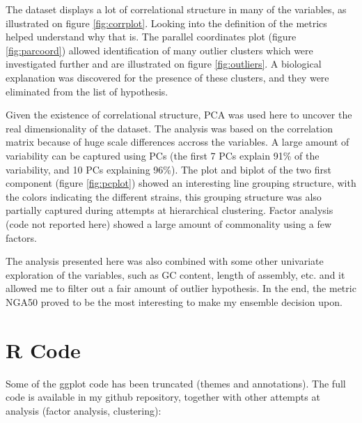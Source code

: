 \documentclass[11pt, a4paper,titlepage]{article}
\begin{document}
The dataset displays a lot of correlational structure in many of the
variables, as illustrated on figure \ref{fig:corrplot}. Looking into
the definition of the metrics helped understand why that is. The
parallel coordinates plot (figure \ref{fig:parcoord}) allowed
identification of many outlier clusters which were investigated
further and are illustrated on figure \ref{fig:outliers}. A biological
explanation was discovered for the presence of these clusters, and
they were eliminated from the list of hypothesis.

Given the existence of correlational structure, PCA was used here to
uncover the real dimensionality of the dataset. The analysis was based
on the correlation matrix because of huge scale differences accross
the variables. A large amount of variability can be captured using PCs
(the first 7 PCs explain 91\% of the variability, and 10 PCs
explaining 96\%). The plot and biplot of the two first component
(figure \ref{fig:pcplot}) showed an interesting line grouping
structure, with the colors indicating the different strains, this
grouping structure was also partially captured during attempts at
hierarchical clustering. Factor analysis (code not reported here)
showed a large amount of commonality using a few factors.

The analysis presented here was also combined with some other
univariate exploration of the variables, such as GC content, length of
assembly, etc. and it allowed me to filter out a fair amount of
outlier hypothesis. In the end, the metric NGA50 proved to be the most
interesting to make my ensemble decision upon.

\section{R Code}

Some of the ggplot code has been truncated (themes and
annotations). The full code is available in my github repository,
together with other attempts at analysis (factor analysis,
clustering):
\end{document}
